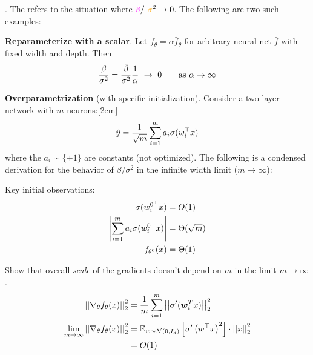 \documentclass[11pt]{article}
\renewcommand\vec[2][]{\bm{#2}_{#1}}
\begin{document}
. The  refers to the situation where $\mpink\beta /\morange{\sigma}^2 \to 0$. The following are two such examples:
\begin{compactenum}
	\item \textbf{Reparameterize with a scalar}. Let $f_{\theta} = \alpha \bar{f}_{\theta}$ for arbitrary neural net $\bar{f}$ with fixed width and depth. Then
	\begin{align}
		\frac{\beta}{\sigma^2} = \frac{\bar\beta}{\bar\sigma^2} \frac{1}{\alpha} ~\to~ 0 \qquad\text{as }   \alpha \to \infty
	\end{align}

	\item \textbf{Overparametrization} (with specific initialization). Consider a two-layer network with $m$ neurons:[2em]
	\begin{align}
		\hat y = \frac{1}{\sqrt m} \sum_{i=1}^{m} a_i \sigma(w_i^\top x)
	\end{align}
	where the $a_i \sim \{\pm 1\}$ are constants (not optimized). The following is a condensed derivation for the behavior of $\beta/\sigma^2$ in the infinite width limit ($m \to \infty$):
	\begin{compactenum}
		\item Key initial observations:
		\begin{align}
			\sigma(w_i^{0^\top} x) &= O(1) \\
			\left| \sum_{i=1}^{m} a_i \sigma(w_i^{0^\top} x) \right|
				&= \Theta(\sqrt{m}) \\
			f_{\theta^0}(x) &= \Theta(1)
		\end{align}
		
		\item Show that overall \textit{scale} of the gradients doesn't depend on $m$ in the limit $m \to \infty$. 
		\begin{align}
			\norm{\nabla_{\theta} f_{\theta}(x)}^2 
				&= \inv{m} \imsum \norm{\sigma'(\vec[i]{w}^T x)}^2 \\
			\lim_{m \to \infty} \norm{\nabla_{\theta} f_{\theta}(x)}^2 
				&= \E[w \sim \Gauss{0, I_d}]{\sigma'\lr{w^\top x}^2} \cdot \norm{x}^2 \\
				&= O(1)
		\end{align}
	

\end{compactenum}
\end{compactenum}
\end{document}
